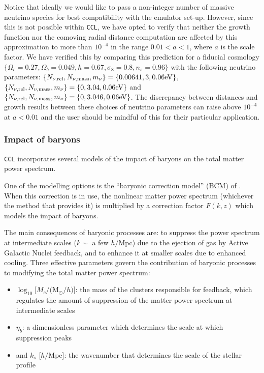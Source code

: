 \documentclass[\docopts]{\docclass}
\newcommand{\ccl}{{\tt CCL}\xspace}
\begin{document}
Notice that ideally we would like to pass a non-integer number of massive
neutrino species for best compatibility with the emulator set-up. However,
since this is not possible within {\tt CCL}, we have opted to verify that neither
the growth function nor the comoving radial distance computation are affected by
this approximation to more than $10^{-4}$ in the range $0.01<a<1$, where $a$ is
the scale factor. We have verified this by comparing this prediction for a
fiducial cosmology $\{\Omega_c=0.27,\Omega_b=0.049,h=0.67,\sigma_8=0.8,n_s=0.96\}$
with the following neutrino parameters:
$\{N_{\nu,{\rm rel}},N_{\nu,{\rm mass}},m_{\nu}\}=\{0.00641,3,0.06{\rm eV}\}$, $\{N_{\nu,{\rm rel}},N_{\nu,{\rm mass}},m_{\nu}\}=\{0,3.04,0.06{\rm eV}\}$ and
$\{N_{\nu,{\rm rel}},N_{\nu,{\rm mass}},m_{\nu}\}=\{0,3.046,0.06{\rm eV}\}$. The
discrepancy between distances and growth results between these choices of
neutrino parameters can raise above $10^{-4}$ at $a<0.01$ and the user should
be mindful of this for their particular application.

\subsubsection{Impact of baryons}
\label{ss:baryons}

\ccl incorporates several models of the impact of baryons on the total matter power spectrum.

One of the modelling options is the ``baryonic correction model'' (BCM) of \citet{Schneider15}. When this
correction is in use, the nonlinear matter power spectrum (whichever the
method that provides it) is multiplied by a correction factor $F(k,z)$ which
models the impact of baryons.

The main consequences of baryonic processes are: to suppress the power spectrum
at intermediate scales ($k\sim$ a few $h/$Mpc) due to the ejection of gas by
Active Galactic Nuclei feedback, and to enhance it at smaller scales due to
enhanced cooling. Three effective parameters govern the contribution of baryonic
processes to modifying the total matter power spectrum:

\begin{itemize}
  \item $\log_{10} [M_c/($M$_\odot/h)]$: the mass of the clusters responsible for
    feedback, which regulates the amount of suppression of the matter power spectrum at intermediate scales
  \item $\eta_b$: a dimensionless parameter which determines the scale at which suppression peaks
  \item and $k_s$ [$h/$Mpc]: the wavenumber that determines the scale of the stellar profile
\end{itemize}
\end{document}
